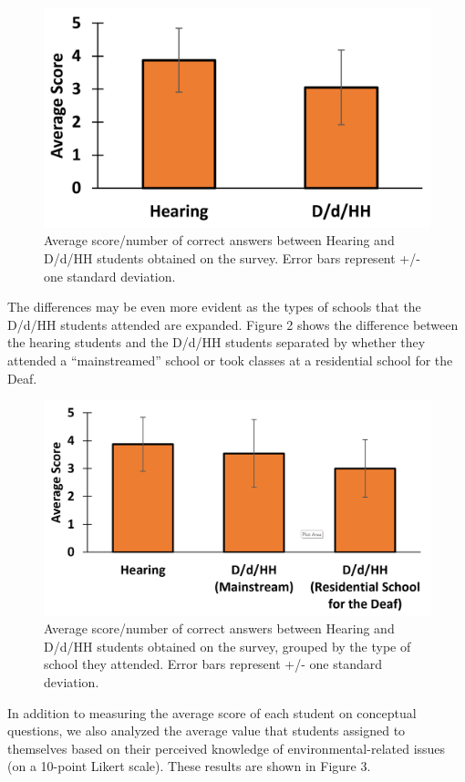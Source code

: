 \documentclass[11.5pt]{sig-alternate} %
\begin{document}
\begin{large}
\begin{figure}[h]
    \centering
    \includegraphics[width=1\linewidth]{Fig1.jpg}
    \caption{Average score/number of correct answers between Hearing and D/d/HH students obtained on the survey.  Error bars represent +/- one standard deviation.}
\end{figure}

The differences may be even more evident as the types of schools that the D/d/HH students attended are expanded. Figure 2 shows the difference between the hearing students and the D/d/HH students separated by whether they attended a “mainstreamed” school or took classes at a residential school for the Deaf.

\begin{figure}[h]
    \centering
    \includegraphics[width=1\linewidth]{Fig2.jpg}
    \caption{Average score/number of correct answers between Hearing and D/d/HH students obtained on the survey, grouped by the type of school they attended.  Error bars represent +/- one standard deviation.}
\end{figure}

In addition to measuring the average score of each student on conceptual questions, we also analyzed the average value that students assigned to themselves based on their perceived knowledge of environmental-related issues (on a 10-point Likert scale). These results are shown in Figure 3.


\end{large}
\end{document}
